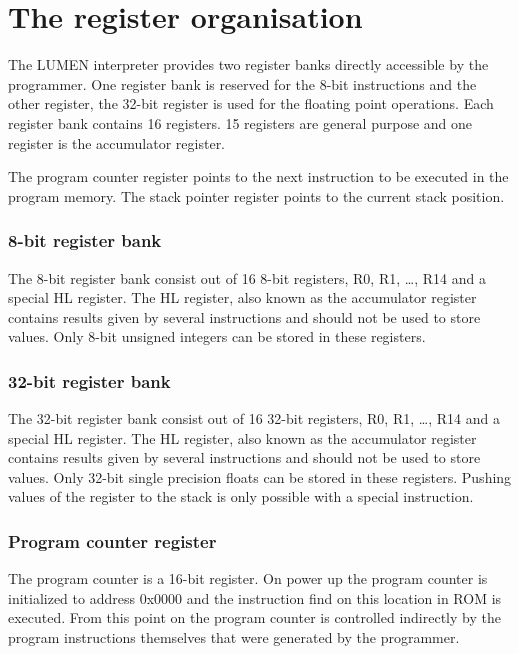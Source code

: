 \chapter{The register organisation}
\label{cha:RegisterOrganisation} 

\par \noindent The LUMEN interpreter provides two register banks directly accessible by the programmer. One register bank is reserved for the 8-bit 
instructions and the other register, the 32-bit register is used for the floating point operations. Each register bank contains 16 registers.
15 registers are general purpose and one register is the accumulator register. \bigskip

\par \noindent The program counter register points to the next instruction to be executed in the program memory. The stack pointer register points to the current
stack position. 

\subsection {8-bit register bank}
\par \noindent The 8-bit register bank consist out of 16 8-bit registers, R0, R1, \ldots , R14 and a special HL register. The HL register, also known as 
the accumulator register contains results given by several instructions and should not be used to store values. Only 8-bit unsigned integers can be 
stored in these registers. 

\subsection{32-bit register bank}
\par \noindent The 32-bit register bank consist out of 16 32-bit registers, R0, R1, \ldots , R14 and a special HL register. The HL register, also known as 
the accumulator register contains results given by several instructions and should not be used to store values. Only 32-bit  single precision floats 
can be stored in these registers. Pushing values of the register to the stack is only possible with a special instruction.

\subsection {Program counter register}
\par \noindent The program counter is a 16-bit register. On power up the program counter is initialized to address 0x0000 and the instruction find
 on this location in ROM is executed. From this point on the program counter is controlled indirectly by the program instructions themselves 
 that were generated by the programmer. 

